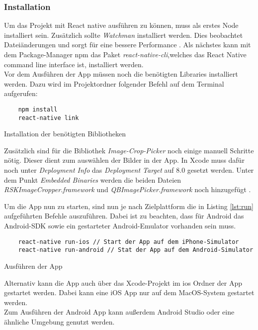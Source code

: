        \subsubsection{Installation}
Um das Projekt mit React native ausführen zu können, muss als erstes Node installiert sein. Zusätzlich sollte \textit{Watchman} installiert werden. Dies beobachtet Dateiänderungen und sorgt für eine bessere Performance \cite{facebook_inc._start_2017}.  Als nächstes kann mit dem Package-Manager npm das Paket \textit{react-native-cli},welches das  React Native command line interface ist, installiert werden. \\

Vor dem Ausführen der App müssen noch die benötigten Libraries installiert werden. Dazu wird im Projektordner folgender Befehl auf dem Terminal aufgerufen:
\begin{listing}[H]
    \begin{verbatim}
    npm install
    react-native link
    \end{verbatim}
    \caption{Installation der benötigten Bibliotheken}
    \label{lst:npm_linstall}
\end{listing}
Zusätzlich sind für die Bibliothek \textit{Image-Crop-Picker } noch einige manuell Schritte nötig. Dieser dient zum auswählen der Bilder in der App. In Xcode muss dafür noch unter \textit{Deployment Info} das \textit{Deployment Target} auf 8.0 gesetzt werden. Unter dem Punkt \textit{Embedded Binaries} werden die beiden Dateien \textit{RSKImageCropper.framework} und \textit{QBImagePicker.framework} noch hinzugefügt \cite{pusic_crop_2017}.

Um die App nun zu starten, sind nun je nach Zielplattform die in Listing \ref{lst:run} aufgeführten Befehle auszuführen. Dabei ist zu beachten, dass für Android das Android-SDK sowie ein gestarteter Android-Emulator vorhanden sein muss.
\begin{listing}[H]
    \begin{verbatim}
    react-native run-ios // Start der App auf dem iPhone-Simulator
    react-native run-android // Stat der App auf dem Android-Simulator
    \end{verbatim}
    \caption{Ausführen der App}
    \label{lst:run}
\end{listing}

Alternativ kann die App auch über das Xcode-Projekt im ios Ordner der App gestartet werden. Dabei kann eine iOS App nur auf dem MacOS-System gestartet werden. \cite{facebook_inc._start_2017}\\
Zum Ausführen der Android App kann außerdem Android Studio oder eine ähnliche Umgebung genutzt werden.

